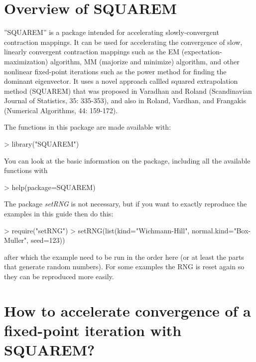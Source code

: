 \documentclass[english]{article}
\begin{document}


\section{Overview of SQUAREM}
''SQUAREM'' is a package intended for accelerating slowly-convergent contraction mappings.  It can be used for accelerating the convergence of slow, linearly convergent contraction mappings such as the EM (expectation-maximization) algorithm, MM (majorize and minimize) algorithm, and other nonlinear fixed-point iterations such as the power method for finding the dominant eigenvector.  It uses a novel approach callled squared extrapolation method (SQUAREM) that was proposed in Varadhan and Roland (Scandinavian Journal of Statistics, 35: 335-353), and also in Roland, Vardhan, and Frangakis (Numerical Algorithms, 44: 159-172).

The functions in this package are made available with:

\begin{Schunk}
\begin{Sinput}
> library("SQUAREM") 
\end{Sinput}
\end{Schunk}

You can look at the basic information on the package, including all the 
available functions with

\begin{Schunk}
\begin{Sinput}
> help(package=SQUAREM)
\end{Sinput}
\end{Schunk}



The package \emph{setRNG} is not necessary, but if you want to exactly 
reproduce the examples in this guide then do this:
\begin{Schunk}
\begin{Sinput}
> require("setRNG") 
> setRNG(list(kind="Wichmann-Hill", normal.kind="Box-Muller", seed=123))
\end{Sinput}
\end{Schunk}
after which the example need to be run in the order here (or at least the parts
that generate random numbers). For some examples the RNG is reset again
so they can be reproduced more easily.

\section{How to accelerate convergence of a fixed-point iteration with SQUAREM?}
\end{document}
